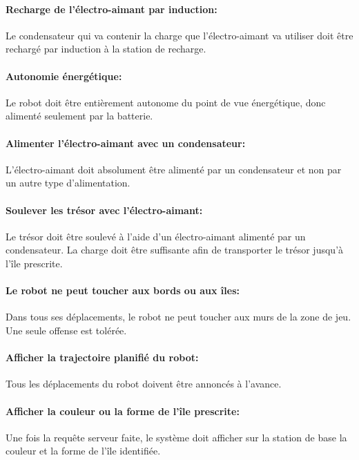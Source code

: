 \paragraph{Recharge de l'électro-aimant par induction:}
Le condensateur qui va contenir la charge que l'électro-aimant va utiliser doit être rechargé par induction à la station de recharge.

\paragraph{Autonomie énergétique:}
Le robot doit être entièrement autonome du point de vue énergétique, donc alimenté seulement par la batterie.

\paragraph{Alimenter l'électro-aimant avec un condensateur:}
L'électro-aimant doit absolument être alimenté par un condensateur et non par un autre type d'alimentation.

\paragraph{Soulever les trésor avec l'électro-aimant:}
Le trésor doit être soulevé à l'aide d'un électro-aimant alimenté par un condensateur. La charge doit être suffisante afin de transporter le trésor jusqu'à l'île prescrite.

\paragraph{Le robot ne peut toucher aux bords ou aux îles:}
Dans tous ses déplacements, le robot ne peut toucher aux murs de la zone de jeu. Une seule offense est tolérée.

\paragraph{Afficher la trajectoire planifié du robot:}
Tous les déplacements du robot doivent être annoncés à l'avance.

\paragraph{Afficher la couleur ou la forme de l'île prescrite:} Une fois la requête serveur faite, le système doit afficher sur la station de base la couleur et la forme de l'île identifiée.

